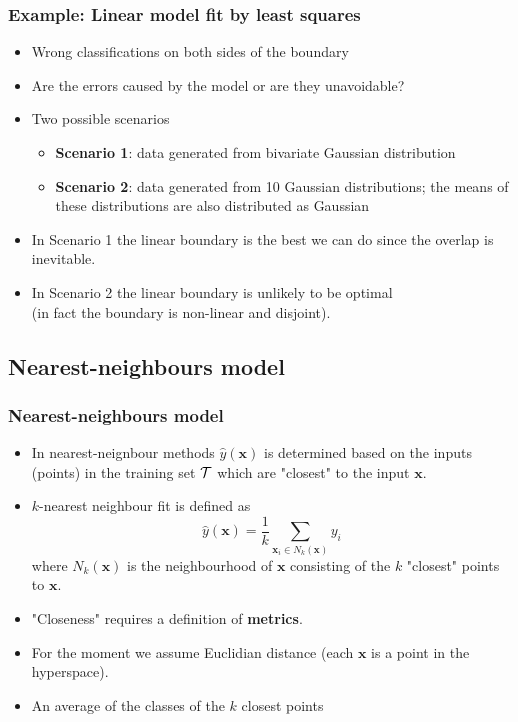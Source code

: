 \documentclass[notes]{beamer}          %
\newcommand{\vect}[1]{\bm{#1}}
\begin{document}
\begin{frame}
\frametitle{Example: Linear model fit by least squares}
\begin{itemize}
    \item Wrong classifications on both sides of the boundary
    \item Are the errors caused by the model or are they unavoidable?
    \item Two possible scenarios
        \begin{itemize}
            \item {\bf Scenario 1}: data generated from bivariate Gaussian distribution
            \item {\bf Scenario 2}: data generated from 10 Gaussian distributions; the means of these distributions are also distributed as Gaussian
        \end{itemize}
    \item In Scenario 1 the linear boundary is the best we can do since the overlap is inevitable.
    \item In Scenario 2 the linear boundary is unlikely to be optimal \\
          (in fact the boundary is non-linear and disjoint).
\end{itemize}

\end{frame}

\subsection{Nearest-neighbours model}

\begin{frame}
\frametitle{Nearest-neighbours model}
    \begin{itemize}
        \item In nearest-neignbour methods $\hat{y}(\vect{x})$ is determined based on the inputs (points) in the training set $\cal{T}$ which are "closest" to the input $\vect{x}$.
        \item $k$-nearest neighbour fit is defined as
        $$ \hat{y}(\vect{x}) = \frac{1}{k} \sum_{\vect{x}_i \in N_k(\vect{x})} y_i $$
        where $N_k(\vect{x})$ is the neighbourhood of $\vect{x}$ consisting of the $k$ "closest" points to $\vect{x}$.
        \item "Closeness" requires a definition of {\bf metrics}.
        \item For the moment we assume Euclidian distance (each $\vect{x}$ is a point in the hyperspace).
        \item An average of the classes of the $k$ closest points
    \end{itemize}
\end{frame}
\end{document}
